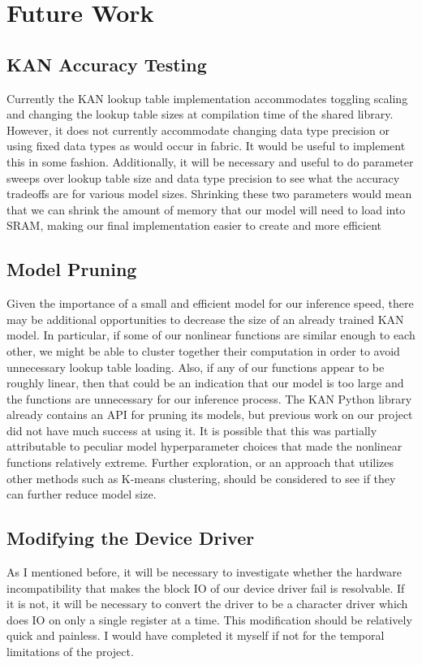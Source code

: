 \documentclass[psamsfonts]{amsart}
\theoremstyle{definition}
\theoremstyle{remark}
\numberwithin{equation}{section}
\begin{document}

\section{Future Work}
\subsection{KAN Accuracy Testing}
Currently the KAN lookup table implementation accommodates toggling scaling and changing the lookup table sizes at compilation time of the shared library. However, it does not currently accommodate changing data type precision or using fixed data types as would occur in fabric. It would be useful to implement this in some fashion. Additionally, it will be necessary and useful to do parameter sweeps over lookup table size and data type precision to see what the accuracy tradeoffs are for various model sizes. Shrinking these two parameters would mean that we can shrink the amount of memory that our model will need to load into SRAM, making our final implementation easier to create and more efficient

\subsection{Model Pruning}
Given the importance of a small and efficient model for our inference speed, there may be additional opportunities to decrease the size of an already trained KAN model. In particular, if some of our nonlinear functions are similar enough to each other, we might be able to cluster together their computation in order to avoid unnecessary lookup table loading. Also, if any of our functions appear to be roughly linear, then that could be an indication that our model is too large and the functions are unnecessary for our inference process. The KAN Python library already contains an API for pruning its models, but previous work on our project did not have much success at using it. It is possible that this was partially attributable to peculiar model hyperparameter choices that made the nonlinear functions relatively extreme. Further exploration, or an approach that utilizes other methods such as K-means clustering, should be considered to see if they can further reduce model size.

\subsection{Modifying the Device Driver}
As I mentioned before, it will be necessary to investigate whether the hardware incompatibility that makes the block IO of our device driver fail is resolvable. If it is not, it will be necessary to convert the driver to be a character driver which does IO on only a single register at a time. This modification should be relatively quick and painless. I would have completed it myself if not for the temporal limitations of the project.
\end{document}
